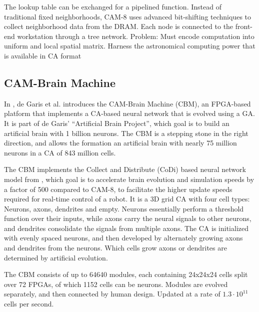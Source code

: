The lookup table can be exchanged for a pipelined function.
Instead of traditional fixed neighborhoods, CAM-8 uses advanced bit-shifting techniques to collect neighborhood data from the DRAM.
Each node is connected to the front-end workstation through a tree network.
Problem: Must encode computation into uniform and local spatial matrix.
Harness the astronomical computing power that is available in CA format

\subsection{CAM-Brain Machine}

In \cite{degaris2001cbm}, de Garis et al. introduces the CAM-Brain Machine (CBM), an FPGA-based platform that implements a CA-based neural network that is evolved using a GA.
It is part of de Garis' ``Artificial Brain Project'', which goal is to build an artificial brain with 1 billion neurons.
The CBM is a stepping stone in the right direction, and allows the formation an artificial brain with nearly 75 million neurons in a CA of 843 million cells.

The CBM implements the Collect and Distribute (CoDi) based neural network model from \cite{gers1998codi}, which goal is to accelerate brain evolution and simulation speeds by a factor of 500 compared to CAM-8, to facilitate the higher update speeds required for real-time control of a robot.
It is a 3D grid CA with four cell types: Neurons, axons, dendrites and empty.
Neurons essentially perform a threshold function over their inputs, while axons carry the neural signals to other neurons, and dendrites consolidate the signals from multiple axons.
The CA is initialized with evenly spaced neurons, and then developed by alternately growing axons and dendrites from the neurons.
Which cells grow axons or dendrites are determined by artificial evolution.

The CBM consists of up to 64640 modules, each containing 24x24x24 cells split over 72 FPGAs, of which 1152 cells can be neurons.
Modules are evolved separately, and then connected by human design.
Updated at a rate of $1.3 \cdot 10^{11}$ cells per second.

